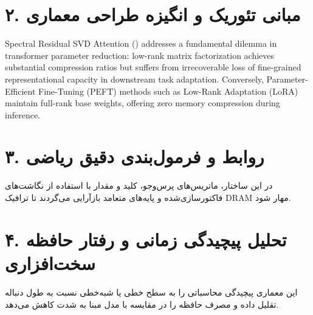 \documentclass[12pt,a4paper]{article}
\begin{document}
\section*{۲. مبانی تئوریک و انگیزه طراحی معماری}
Spectral Residual SVD Attention () addresses a fundamental dilemma in transformer parameter reduction: low-rank matrix factorization achieves substantial compression ratios but suffers from irrecoverable loss of fine-grained representational capacity in downstream task adaptation. Conversely, Parameter-Efficient Fine-Tuning (PEFT) methods such as Low-Rank Adaptation (LoRA) maintain full-rank base weights, offering zero memory compression during inference.

\section*{۳. روابط و فرمول‌بندی دقیق ریاضی}
در این ساختار، ماتریس‌های پرس‌وجو، کلید و مقدار با استفاده از نگاشت‌های فاکتورسازی‌شده و پایه‌های متعامد بازآرایی می‌گردند تا ترافیک DRAM مهار شود.

\section*{۴. تحلیل پیچیدگی زمانی و رفتار حافظه سخت‌افزاری}
این معماری پیچیدگی محاسباتی را به سطح خطی یا شبه‌خطی نسبت به طول دنباله تقلیل داده و مصرف حافظه را در مقایسه با مدل مبنا به شدت کاهش می‌دهد.
\end{document}
